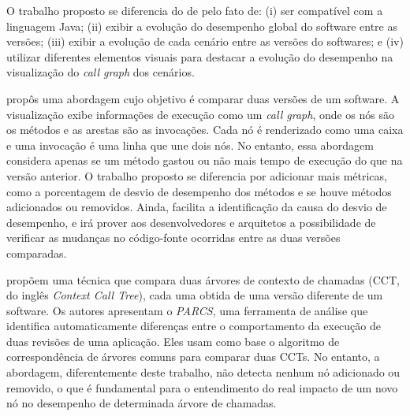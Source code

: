 O trabalho proposto se diferencia do de \citeauthor{SandovalAlcocer2013} pelo fato de: (i) ser compatível com a linguagem Java; (ii) exibir a evolução do desempenho global do software entre as versões; (iii) exibir a evolução de cada cenário entre as versões do softwares; e (iv) utilizar diferentes elementos visuais para destacar a evolução do desempenho na visualização do \textit{call graph} dos cenários.

\citeauthor{Bergel} propôs uma abordagem cujo objetivo é comparar duas versões de um software. A visualização exibe informações de execução como um \textit{call graph}, onde os nós são os métodos e as arestas são as invocações. Cada nó é renderizado como uma caixa e uma invocação é uma linha que une dois nós. No entanto, essa abordagem considera apenas se um método gastou ou não mais tempo de execução do que na versão anterior. O trabalho proposto se diferencia por adicionar mais métricas, como a porcentagem de desvio de desempenho dos métodos e se houve métodos adicionados ou removidos. Ainda, facilita a identificação da causa do desvio de desempenho, e irá prover aos desenvolvedores e arquitetos a possibilidade de verificar as mudanças no código-fonte ocorridas entre as duas versões comparadas.

\citeauthor{Mostafa2009} propõem uma técnica que compara duas árvores de contexto de chamadas (CCT, do inglês \textit{Context Call Tree}), cada uma obtida de uma versão diferente de um software. Os autores apresentam o \textit{PARCS}, uma ferramenta de análise que identifica automaticamente diferenças entre o comportamento da execução de duas revisões de uma aplicação. Eles usam como base o algoritmo de correspondência de árvores comuns para comparar duas CCTs. No entanto, a abordagem, diferentemente deste trabalho, não detecta nenhum nó adicionado ou removido, o que é fundamental para o entendimento do real impacto de um novo nó no desempenho de determinada árvore de chamadas.